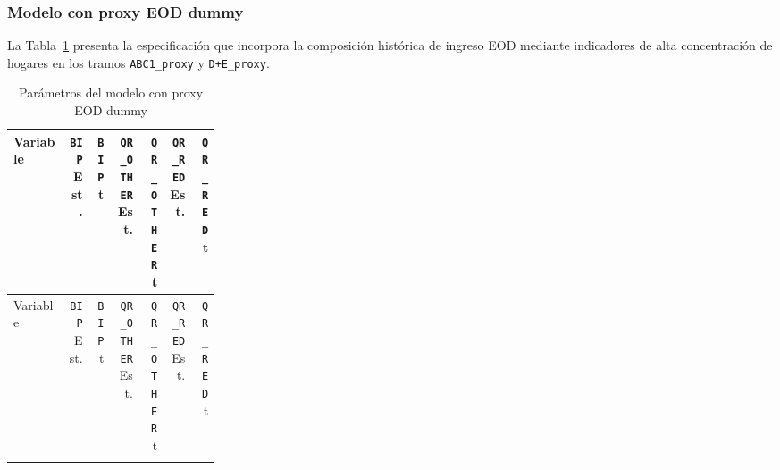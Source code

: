 \subsubsection{Modelo con proxy EOD dummy}

La Tabla~\ref{tab:parametros_modelo_dummy} presenta la especificación que incorpora la composición
histórica de ingreso EOD mediante indicadores de alta concentración de hogares en los tramos
\texttt{ABC1\_proxy} y \texttt{D+E\_proxy}.

\begin{landscape}
\small
\setlength{\tabcolsep}{3pt}
\begin{longtable}{p{0.27\linewidth}rrrrrr}
\caption{Parámetros del modelo con proxy EOD dummy}
\label{tab:parametros_modelo_dummy}\\
\toprule
Variable &
\texttt{BIP} Est. & \texttt{BIP} t &
\texttt{QR\_OTHER} Est. & \texttt{QR\_OTHER} t &
\texttt{QR\_RED} Est. & \texttt{QR\_RED} t \\
\midrule
\endfirsthead

\toprule
Variable &
\texttt{BIP} Est. & \texttt{BIP} t &
\texttt{QR\_OTHER} Est. & \texttt{QR\_OTHER} t &
\texttt{QR\_RED} Est. & \texttt{QR\_RED} t \\
\midrule
\endhead

\bottomrule
\endfoot


\end{longtable}
\end{landscape}
